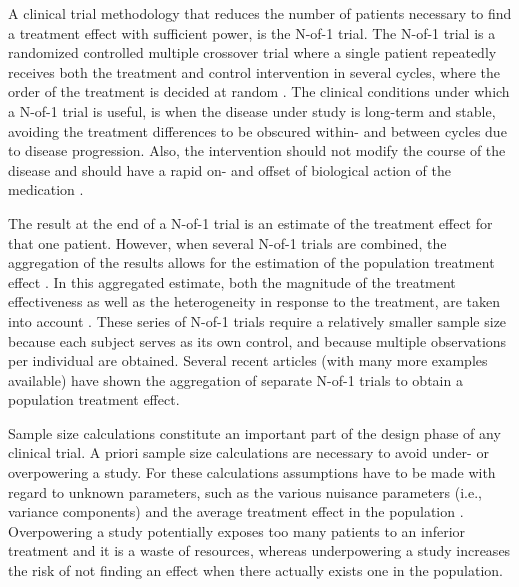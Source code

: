 \documentclass[11pt]{article}
\begin{document}
A clinical trial methodology that reduces the number of patients necessary to find a treatment effect with sufficient power, is the N-of-1 trial. The N-of-1 trial is a randomized controlled multiple crossover trial where a single patient repeatedly receives both the treatment and control intervention in several cycles, where the order of the treatment is decided at random \cite{guyatt1986}. The clinical conditions under which a N-of-1 trial is useful, is when the disease under study is long-term and stable, avoiding the treatment differences to be obscured within- and between cycles due to disease progression. Also, the intervention should not modify the course of the disease and should have a rapid on- and offset of biological action of the medication \cite{araujo2016, nikles2011}.

The result at the end of a N-of-1 trial is an estimate of the treatment effect for that one patient. However, when several N-of-1 trials are combined, the aggregation of the results allows for the estimation of the population treatment effect \cite{zucker1997}. In this aggregated estimate, both the magnitude of the treatment effectiveness as well as the heterogeneity in response to the treatment, are taken into account \cite{zucker1997}. These series of N-of-1 trials require a relatively smaller sample size because each subject serves as its own control, and because multiple observations per individual are obtained. Several recent articles \cite{stunnenberg2018, mitchell2015, roustit2018} (with many more examples available) have shown the aggregation of separate N-of-1 trials to obtain a population treatment effect. 

Sample size calculations constitute an important part of the design phase of any clinical trial. A priori sample size calculations are necessary to avoid under- or overpowering a study. For these calculations assumptions have to be made with regard to unknown parameters, such as the various nuisance parameters (i.e., variance components) and the average treatment effect in the population \cite{proschan2009}. Overpowering a study potentially exposes too many patients to an inferior treatment and it is a waste of resources, whereas underpowering a study increases the risk of not finding an effect when there actually exists one in the population. 
\end{document}
